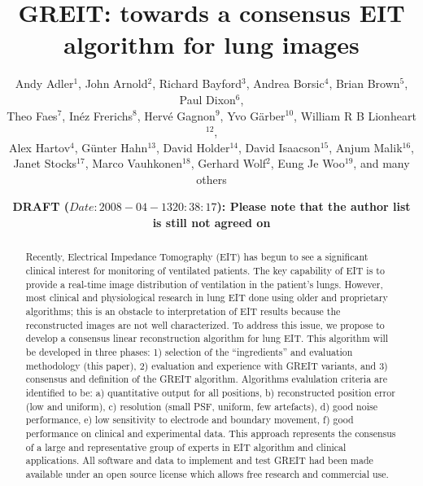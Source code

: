 \documentclass[letterpaper,twocolumn,11pt]{article}
\begin{document}
\title{\bf GREIT: towards a consensus EIT algorithm for lung images}

\author{Andy Adler$^{1}$,
        John Arnold$^{2}$,
        Richard Bayford$^{3}$,
        Andrea Borsic$^{4}$,
        Brian Brown$^{5}$,
        Paul Dixon$^{6}$,
\\
        Theo Faes$^{7}$,
        In\'ez Frerichs$^{8}$,
        Herv\'e Gagnon$^{9}$,
        Yvo G\"arber$^{10}$,
        William R B Lionheart$^{12}$,
\\
        Alex Hartov$^{4}$,
        G\"unter Hahn$^{13}$,
        David Holder$^{14}$,
        David Isaacson$^{15}$,
        Anjum Malik$^{16}$,
\\
        Janet Stocks$^{17}$,
        Marco Vauhkonen$^{18}$,
        Gerhard Wolf$^{2}$,
        Eung Je Woo$^{19}$,
        and many others%
       }

\date{\bf DRAFT ($Date: 2008-04-13 20:38:17 $): Please note that the
           author list is still not agreed on}
\maketitle



\begin{abstract}
Recently, Electrical Impedance Tomography (EIT) has begun to see a
significant clinical interest for monitoring of
ventilated patients.  The key capability of EIT is to
provide a real-time image distribution of ventilation in
the patient's lungs.
However, most clinical and physiological research in lung EIT
done using older and proprietary algorithms; this is
an obstacle to interpretation of EIT results because the
reconstructed images are not well characterized.
To address this issue, we propose to develop a 
consensus linear reconstruction algorithm for lung EIT.
This algorithm will be developed in three phases:
1) selection of the ``ingredients'' and evaluation 
methodology (this paper),
2) evaluation and experience with GREIT variants, and
3) consensus and definition of the GREIT algorithm.
Algorithms evalulation criteria are identified to be:
a) quantitative output for all positions,
b) reconstructed position error (low and uniform),
c) resolution (small PSF, uniform, few artefacts),
d) good noise performance,
e) low sensitivity to electrode and boundary movement,
f) good performance on clinical and experimental data.
This approach represents the consensus of a large and representative
group of experts in EIT algorithm and clinical applications.
All software and data to implement and test GREIT had been
made available under an open source license which allows free
research and commercial use.
\end{abstract}
\end{document}
